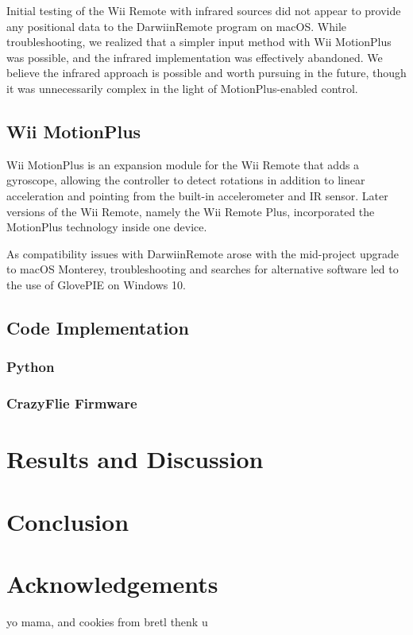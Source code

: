 \documentclass[conf]{new-aiaa}
\begin{document}
        Initial testing of the Wii Remote with infrared sources did not appear to provide any positional data to the DarwiinRemote program on macOS. While troubleshooting, we realized that a simpler input method with Wii MotionPlus was possible, and the infrared implementation was effectively abandoned. We believe the infrared approach is possible and worth pursuing in the future, though it was unnecessarily complex in the light of MotionPlus-enabled control. 
    
    \subsection{Wii MotionPlus} %
    
        Wii MotionPlus is an expansion module for the Wii Remote that adds a gyroscope, allowing the controller to detect rotations in addition to linear acceleration and pointing from the built-in accelerometer and IR sensor. Later versions of the Wii Remote, namely the Wii Remote Plus, incorporated the MotionPlus technology inside one device.
        
        As compatibility issues with DarwiinRemote arose with the mid-project upgrade to macOS Monterey, troubleshooting and searches for alternative software led to the use of GlovePIE on Windows 10.
    
    

    \subsection{Code Implementation}
    
        \subsubsection{Python}
        
        \subsubsection{CrazyFlie Firmware}

\section{Results and Discussion}




\section{Conclusion}

\section{Acknowledgements}
yo mama, and cookies from bretl thenk u


\end{document}
